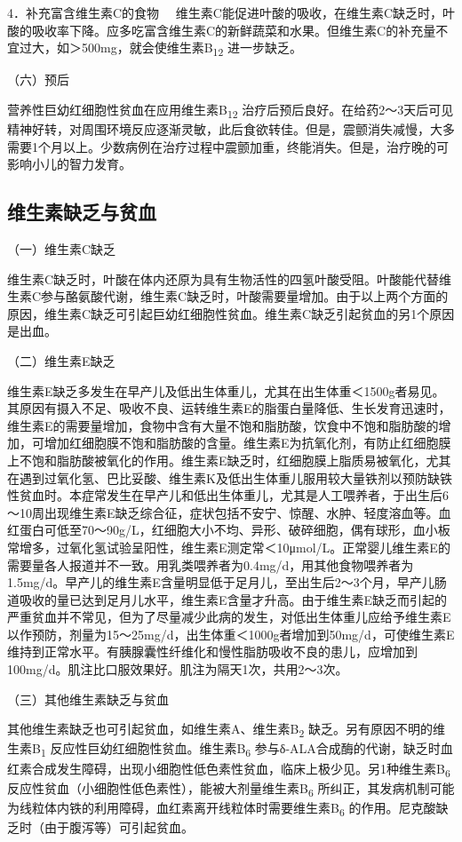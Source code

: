 {4．补充富含维生素C的食物}
　维生素C能促进叶酸的吸收，在维生素C缺乏时，叶酸的吸收率下降。应多吃富含维生素C的新鲜蔬菜和水果。但维生素C的补充量不宜过大，如＞500mg，就会使维生素B\textsubscript{12}
进一步缺乏。

（六）预后

营养性巨幼红细胞性贫血在应用维生素B\textsubscript{12}
治疗后预后良好。在给药2～3天后可见精神好转，对周围环境反应逐渐灵敏，此后食欲转佳。但是，震颤消失减慢，大多需要1个月以上。少数病例在治疗过程中震颤加重，终能消失。但是，治疗晚的可影响小儿的智力发育。

\hypertarget{text00003.htmlux5cux23mllj28}{%
\subsection{维生素缺乏与贫血}\label{text00003.htmlux5cux23mllj28}}

（一）维生素C缺乏

维生素C缺乏时，叶酸在体内还原为具有生物活性的四氢叶酸受阻。叶酸能代替维生素C参与酪氨酸代谢，维生素C缺乏时，叶酸需要量增加。由于以上两个方面的原因，维生素C缺乏可引起巨幼红细胞性贫血。维生素C缺乏引起贫血的另1个原因是出血。

（二）维生素E缺乏

维生素E缺乏多发生在早产儿及低出生体重儿，尤其在出生体重＜1500g者易见。其原因有摄入不足、吸收不良、运转维生素E的脂蛋白量降低、生长发育迅速时，维生素E的需要量增加，食物中含有大量不饱和脂肪酸，饮食中不饱和脂肪酸的增加，可增加红细胞膜不饱和脂肪酸的含量。维生素E为抗氧化剂，有防止红细胞膜上不饱和脂肪酸被氧化的作用。维生素E缺乏时，红细胞膜上脂质易被氧化，尤其在遇到过氧化氢、巴比妥酸、维生素K及低出生体重儿服用较大量铁剂以预防缺铁性贫血时。本症常发生在早产儿和低出生体重儿，尤其是人工喂养者，于出生后6～10周出现维生素E缺乏综合征，症状包括不安宁、惊醒、水肿、轻度溶血等。血红蛋白可低至70～90g/L，红细胞大小不均、异形、破碎细胞，偶有球形，血小板常增多，过氧化氢试验呈阳性，维生素E测定常＜10μmol/L。正常婴儿维生素E的需要量各人报道并不一致。用乳类喂养者为0.4mg/d，用其他食物喂养者为1.5mg/d。早产儿的维生素E含量明显低于足月儿，至出生后2～3个月，早产儿肠道吸收的量已达到足月儿水平，维生素E含量才升高。由于维生素E缺乏而引起的严重贫血并不常见，但为了尽量减少此病的发生，对低出生体重儿应给予维生素E以作预防，剂量为15～25mg/d，出生体重＜1000g者增加到50mg/d，可使维生素E维持到正常水平。有胰腺囊性纤维化和慢性脂肪吸收不良的患儿，应增加到100mg/d。肌注比口服效果好。肌注为隔天1次，共用2～3次。

（三）其他维生素缺乏与贫血

其他维生素缺乏也可引起贫血，如维生素A、维生素B\textsubscript{2}
缺乏。另有原因不明的维生素B\textsubscript{1}
反应性巨幼红细胞性贫血。维生素B\textsubscript{6}
参与δ-ALA合成酶的代谢，缺乏时血红素合成发生障碍，出现小细胞性低色素性贫血，临床上极少见。另1种维生素B\textsubscript{6}
反应性贫血（小细胞性低色素性），能被大剂量维生素B\textsubscript{6}
所纠正，其发病机制可能为线粒体内铁的利用障碍，血红素离开线粒体时需要维生素B\textsubscript{6}
的作用。尼克酸缺乏时（由于腹泻等）可引起贫血。

